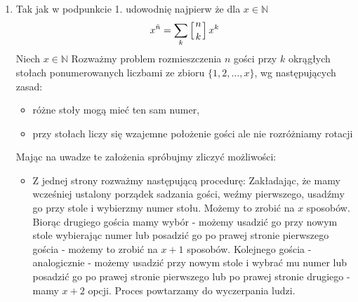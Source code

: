 \documentclass{mwart}
\begin{document}
\begin{mdframed}
\begin{enumerate}
        Porównując oba równoważne sposoby zliczania, stwierdzamy, że:
        \[x^n = \sum_{k=1}^n S(n,k) \cdot x^{\underline{k}}\]
        Zatem udowodniliśmy, że równość ta zachodzi dla wszystkich \( x \in \mathbb{N} \). Ponieważ obie strony są wielomianami stopnia \( n \), a równość zachodzi dla nieskończenie wielu wartości naturalnych, stąd zgodnie z zasadniczym twierdzeniem algebry równość ta jest prawdziwa dla wszystkich liczb rzeczywistych (a nawet zespolonych).
        \qed
        \bigskip \newline
        \textbf{(Bardziej formalnie można zrobić to zadanie rozważając zbiór wszystkich funkcji \(f:\left[ n \right] \longmapsto_{} \left[ x \right] \). Zliczenie z lewej strony trywialne a z drugiej zauważamy, że możemy podzielić dziedzinę na niepuste, rozłączne podzbiory argumentów o tych samych wartościach \(f\))}
        \bigskip \bigskip
        \item 
        Tak jak w podpunkcie 1. udowodnię najpierw że dla \( x \in \mathbb{N} \)
        \[x^{\bar{n}} = \sum_{k} \left[n \atop k \right] x^k\]
        Niech \( x \in \mathbb{N} \)
        Rozważmy problem rozmieszczenia $n$ gości przy $k$ okrągłych stołach ponumerowanych liczbami ze zbioru \(\{1,2,\dots,x\}\), wg następujących zasad:
        \begin{itemize}
            \item różne stoły mogą mieć ten sam numer,
            \item przy stołach liczy się wzajemne położenie gości ale nie rozróżniamy rotacji
        \end{itemize}
        \bigskip
        Mając na uwadze te założenia spróbujmy zliczyć możliwości:
        \begin{itemize}
            \item Z jednej strony rozważmy następującą procedurę:
            \newline
            Zakładając, że mamy wcześniej ustalony porządek sadzania gości, weźmy pierwszego,
             usadźmy go przy stole i wybierzmy numer stołu. Możemy to zrobić na $x$ sposobów.
            Biorąc drugiego gościa mamy wybór - możemy usadzić go przy nowym stole wybierając
             numer lub posadzić go po prawej stronie pierwszego gościa - możemy to zrobić na
              $x+1$ sposobów. Kolejnego gościa - analogicznie
            - możemy usadzić przy nowym stole i wybrać mu numer lub posadzić go po prawej stronie
             pierwszego lub po prawej stronie drugiego - mamy $x+2$ opcji. Proces powtarzamy do wyczerpania ludzi.

\end{itemize}
\end{enumerate}
\end{mdframed}
\end{document}
